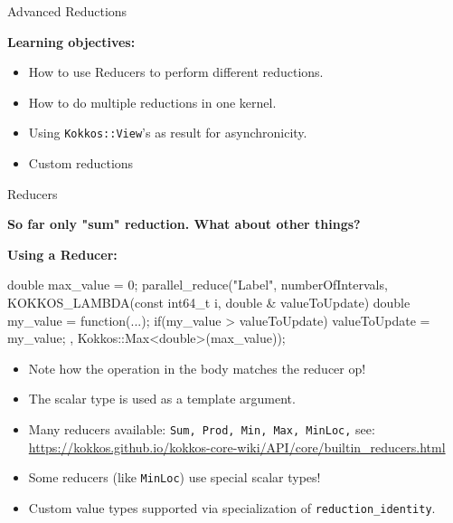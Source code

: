 
\begin{frame}[fragile]{}

  {\Huge Advanced Reductions}

  \vspace{20pt}

  \textbf{Learning objectives:}
  \begin{itemize}
    \item{How to use Reducers to perform different reductions.}
    \item{How to do multiple reductions in one kernel.}
    \item{Using \texttt{Kokkos::View}'s as result for asynchronicity.}
    \item{Custom reductions}
  \end{itemize}

  \vspace{-20pt}

\end{frame}

\begin{frame}[fragile]{Reducers}

\textbf{So far only "sum" reduction. What about other things?}

\textbf{Using a Reducer:}
\begin{code}[linebackgroundcolor={
          \btLstHL<2>{5}{red!20}
        }, keywords={parallel_reduce,double,Max}]
double max_value = 0;
parallel_reduce("Label", numberOfIntervals,
  KOKKOS_LAMBDA(const int64_t i, double & valueToUpdate) {
    double my_value = function(...);
    if(my_value > valueToUpdate) valueToUpdate = my_value;
}, Kokkos::Max<double>(max_value));
\end{code}

\begin{itemize}
\item<2-> Note how the operation in the body matches the reducer op!
\item<3-> The scalar type is used as a template argument.
\item<4-> Many reducers available: \texttt{Sum, Prod, Min, Max, MinLoc,} see:  {\tiny \url{https://kokkos.github.io/kokkos-core-wiki/API/core/builtin_reducers.html}}
\item<5-> Some reducers (like \texttt{MinLoc}) use special scalar types!
\item<6-> Custom value types supported via specialization of \texttt{reduction\_identity}.
\end{itemize}
\end{frame}


